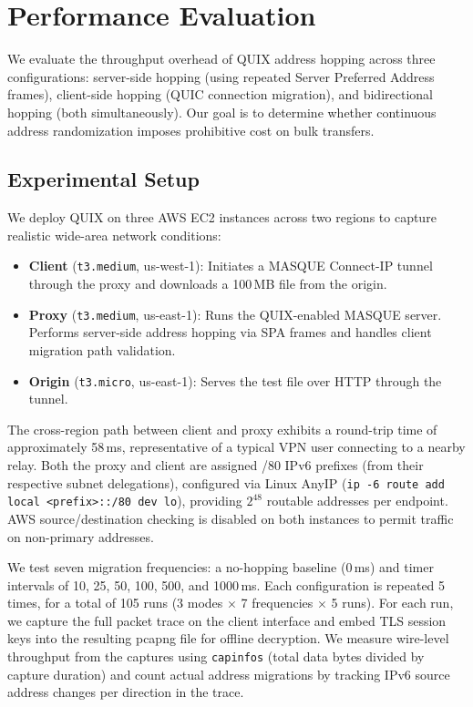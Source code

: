 \section{Performance Evaluation}
\label{sec:evaluation}

We evaluate the throughput overhead of QUIX address hopping across three configurations: server-side hopping (using repeated Server Preferred Address frames), client-side hopping (QUIC connection migration), and bidirectional hopping (both simultaneously). Our goal is to determine whether continuous address randomization imposes prohibitive cost on bulk transfers.

\subsection{Experimental Setup}

We deploy QUIX on three AWS EC2 instances across two regions to capture realistic wide-area network conditions:

\begin{itemize}
    \item \textbf{Client} (\texttt{t3.medium}, us-west-1): Initiates a MASQUE Connect-IP tunnel through the proxy and downloads a 100\,MB file from the origin.
    \item \textbf{Proxy} (\texttt{t3.medium}, us-east-1): Runs the QUIX-enabled MASQUE server. Performs server-side address hopping via SPA frames and handles client migration path validation.
    \item \textbf{Origin} (\texttt{t3.micro}, us-east-1): Serves the test file over HTTP through the tunnel.
\end{itemize}

The cross-region path between client and proxy exhibits a round-trip time of approximately 58\,ms, representative of a typical VPN user connecting to a nearby relay. Both the proxy and client are assigned /80 IPv6 prefixes (from their respective subnet delegations), configured via Linux AnyIP (\texttt{ip -6 route add local <prefix>::/80 dev lo}), providing $2^{48}$ routable addresses per endpoint. AWS source/destination checking is disabled on both instances to permit traffic on non-primary addresses.

We test seven migration frequencies: a no-hopping baseline (0\,ms) and timer intervals of 10, 25, 50, 100, 500, and 1000\,ms. Each configuration is repeated 5 times, for a total of 105 runs (3 modes $\times$ 7 frequencies $\times$ 5 runs). For each run, we capture the full packet trace on the client interface and embed TLS session keys into the resulting pcapng file for offline decryption. We measure wire-level throughput from the captures using \texttt{capinfos} (total data bytes divided by capture duration) and count actual address migrations by tracking IPv6 source address changes per direction in the trace.


